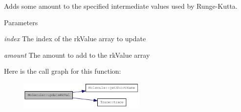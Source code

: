 Adds some amount to the specified intermediate values used by Runge-\/Kutta.


\begin{DoxyParams}{Parameters}
\item[{\em index}]The index of the rkValue array to update \item[{\em amount}]The amount to add to the rkValue array \end{DoxyParams}


Here is the call graph for this function:\nopagebreak
\begin{figure}[H]
\begin{center}
\leavevmode
\includegraphics[width=178pt]{classMolecule_ab1dd1cb050ddb53a5ce4d9635e3ae03b_cgraph}
\end{center}
\end{figure}


